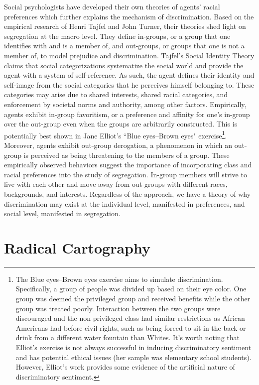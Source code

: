 {Social psychologists have developed their own theories of agents' racial preferences which further explains the mechanism of discrimination. Based on the empirical research of Henri Tajfel and John Turner, their theories shed light on segregation at the macro level\cite{tajfel79}. They define in-groups, or a group that one identifies with and is a member of, and out-groups, or groups that one is not a member of, to model prejudice and discrimination. Tajfel's Social Identity Theory claims that social categorizations systematize the social world and provide the agent with a system of self-reference. As such, the agent defines their identity and self-image from the social categories that he perceives himself belonging to. These categories may arise due to shared interests, shared racial categories, and enforcement by societal norms and authority, among other factors. Empirically, agents exhibit in-group favoritism, or a preference and affinity for one's in-group over the out-group even when the groups are arbitrarily constructed. This is potentially best shown in Jane Elliot's ``Blue eyes–Brown eyes" exercise\footnote{The Blue eyes–Brown eyes exercise aims to simulate discrimination. Specifically, a group of people was divided up based on their eye color. One group was deemed the privileged group and received benefits while the other group was treated poorly. Interaction between the two groups were discouraged and the non-privileged class had similar restrictions as African-Americans had before civil rights, such as being forced to sit in the back or drink from a different water fountain than Whites. It's worth noting that Elliot's exercise is not always successful in inducing discriminatory sentiment and has potential ethical issues (her sample was elementary school students). However, Elliot's work provides some evidence of the artificial nature of discriminatory sentiment.}. Moreover, agents exhibit out-group derogation, a phenomenon in which an out-group is perceived as being threatening to the members of a group. These empirically observed behaviors suggest the importance of incorporating class and racial preferences into the study of segregation. In-group members will strive to live with each other and move away from out-groups with different races, backgrounds, and interests. Regardless of the approach, we have a theory of why discrimination may exist at the individual level, manifested in preferences, and social level, manifested in segregation.

\section{Radical Cartography}

}
